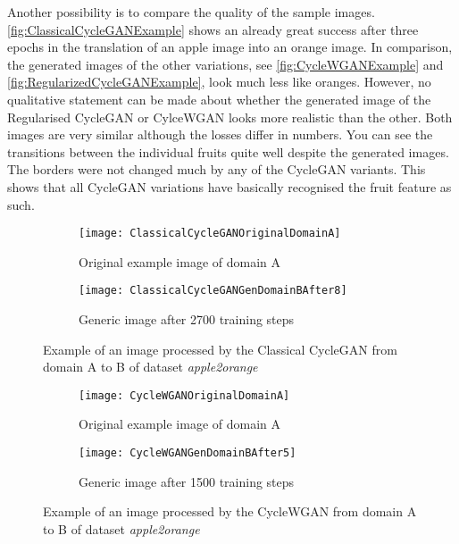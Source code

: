 \documentclass[fleqn,10pt]{SelfArx} %
\begin{document}
Another possibility is to compare the quality of the sample images. \autoref{fig:ClassicalCycleGANExample} shows an already great success after three epochs in the translation of an apple image into an orange image. In comparison, the generated images of the other variations, see \autoref{fig:CycleWGANExample} and \autoref{fig:RegularizedCycleGANExample}, look much less like oranges. However, no qualitative statement can be made about whether the generated image of the Regularised Cycle\ac{GAN} or Cylce{WGAN} looks more realistic than the other. Both images are very similar although the losses differ in numbers.
You can see the transitions between the individual fruits quite well despite the generated images. The borders were not changed much by any of the Cycle\ac{GAN} variants. This shows that all Cycle\ac{GAN} variations have basically recognised the fruit feature as such.

\begin{figure}[htb] 
	\centering 
\begin{subfigure}[b]{0.45\linewidth}
	\texttt{[image: ClassicalCycleGANOriginalDomainA]}
	\caption{Original example image of domain A}
\end{subfigure}
\hfill
\begin{subfigure}[b]{0.45\linewidth}
	\texttt{[image: ClassicalCycleGANGenDomainBAfter8]}
	\caption{Generic image after 2700 training steps}
	\end{subfigure}
\caption{Example of an image processed by the Classical Cycle\ac{GAN} from domain A to B of dataset \textit{apple2orange}}
\label{fig:ClassicalCycleGANExample}
\end{figure}

\begin{figure}[htb] 
	\centering 
\begin{subfigure}[b]{0.45\linewidth}
	\texttt{[image: CycleWGANOriginalDomainA]}
	\caption{Original example image of domain A}
\end{subfigure}
\hfill
\begin{subfigure}[b]{0.45\linewidth}
	\texttt{[image: CycleWGANGenDomainBAfter5]}
	\caption{Generic image after 1500 training steps}
	\end{subfigure}
\caption{Example of an image processed by the Cycle\ac{WGAN} from domain A to B of dataset \textit{apple2orange}}
\label{fig:CycleWGANExample}
\end{figure}
\end{document}
